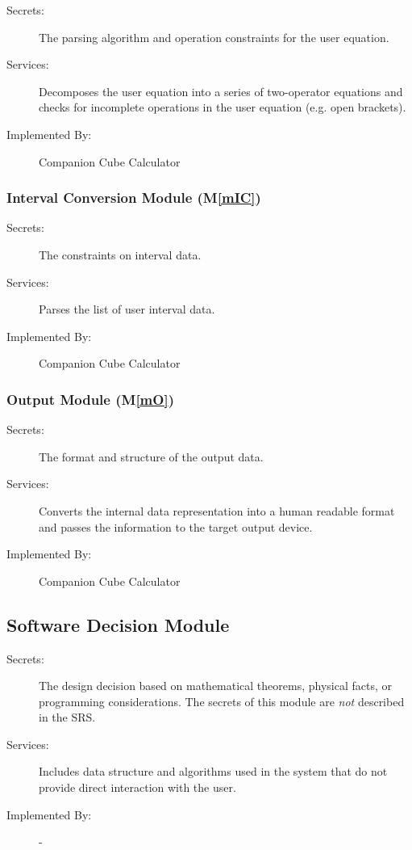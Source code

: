 \documentclass[12pt, titlepage]{article}
\newcommand{\mref}[1]{M\ref{#1}}
\newcommand{\progname}{Companion Cube Calculator} %
\begin{document}
\begin{description}
	\item[Secrets:]The parsing algorithm and operation constraints for the user 
	equation.
	\item[Services:]Decomposes the user equation into a series of two-operator 
	equations and checks for incomplete operations in the user equation (e.g. 
	open brackets).
	\item[Implemented By:] \progname{}
\end{description}

\subsubsection{Interval Conversion Module (\mref{mIC})}

\begin{description}
	\item[Secrets:]The constraints on interval data.
	\item[Services:]Parses the list of user interval data.
	\item[Implemented By:] \progname{}
\end{description}

\subsubsection{Output Module (\mref{mO})}

\begin{description}
	\item[Secrets:]The format and structure of the output data.
	\item[Services:]Converts the internal data representation into a human 
	readable format and passes the information to the target output device.
	\item[Implemented By:] \progname{}
\end{description}


\subsection{Software Decision Module}

\begin{description}
\item[Secrets:] The design decision based on mathematical theorems, physical
  facts, or programming considerations. The secrets of this module are
  \emph{not} described in the SRS.
\item[Services:] Includes data structure and algorithms used in the system that
  do not provide direct interaction with the user. 
\item[Implemented By:] -
\end{description}
\end{document}
